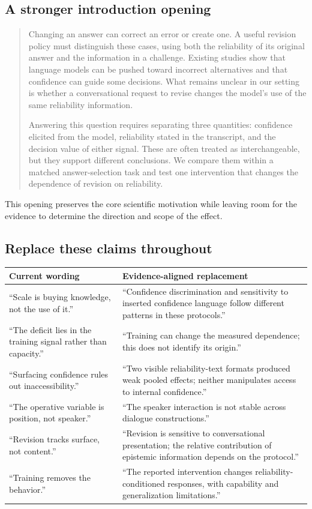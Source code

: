 \documentclass[11pt]{article}
\begin{document}
\subsection{A stronger introduction opening}
\begin{quote}
Changing an answer can correct an error or create one. A useful revision policy must distinguish these cases, using both the reliability of its original answer and the information in a challenge. Existing studies show that language models can be pushed toward incorrect alternatives and that confidence can guide some decisions. What remains unclear in our setting is whether a conversational request to revise changes the model's use of the same reliability information.

Answering this question requires separating three quantities: confidence elicited from the model, reliability stated in the transcript, and the decision value of either signal. These are often treated as interchangeable, but they support different conclusions. We compare them within a matched answer-selection task and test one intervention that changes the dependence of revision on reliability.
\end{quote}
This opening preserves the core scientific motivation while leaving room for the evidence to determine the direction and scope of the effect.

\subsection{Replace these claims throughout}
\begin{tabularx}{\linewidth}{YY}
\toprule
Current wording & Evidence-aligned replacement\\
\midrule
``Scale is buying knowledge, not the use of it.'' & ``Confidence discrimination and sensitivity to inserted confidence language follow different patterns in these protocols.''\\[4pt]
``The deficit lies in the training signal rather than capacity.'' & ``Training can change the measured dependence; this does not identify its origin.''\\[4pt]
``Surfacing confidence rules out inaccessibility.'' & ``Two visible reliability-text formats produced weak pooled effects; neither manipulates access to internal confidence.''\\[4pt]
``The operative variable is position, not speaker.'' & ``The speaker interaction is not stable across dialogue constructions.''\\[4pt]
``Revision tracks surface, not content.'' & ``Revision is sensitive to conversational presentation; the relative contribution of epistemic information depends on the protocol.''\\[4pt]
``Training removes the behavior.'' & ``The reported intervention changes reliability-conditioned responses, with capability and generalization limitations.''\\
\bottomrule
\end{tabularx}
\end{document}
